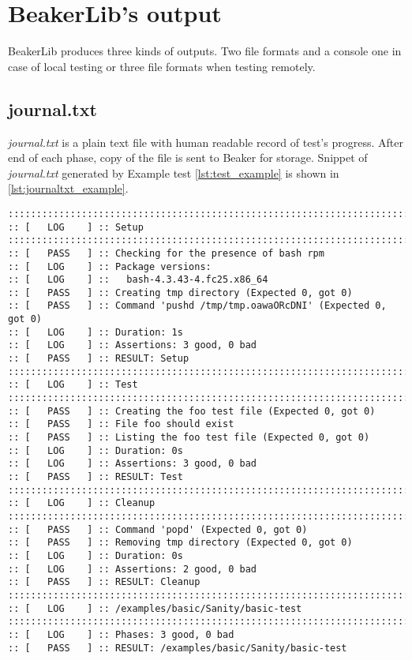 \section{BeakerLib's output}
BeakerLib produces three kinds of outputs. Two file formats and a console one in case of local testing or three file formats when testing remotely.

\subsection{journal.txt}
\textit{journal.txt} is a plain text file with human readable record of test's progress. After end of each phase, copy of the file is sent to Beaker for storage. Snippet of \textit{journal.txt} generated by Example test \ref{lst:test_example} is shown in \ref{lst:journaltxt_example}.


\begin{lstlisting}[style=txt,caption={Example of journal.txt},label={lst:journaltxt_example}]
::::::::::::::::::::::::::::::::::::::::::::::::::::::::::::::::::::::::::::::::
:: [   LOG    ] :: Setup
::::::::::::::::::::::::::::::::::::::::::::::::::::::::::::::::::::::::::::::::
:: [   PASS   ] :: Checking for the presence of bash rpm
:: [   LOG    ] :: Package versions:
:: [   LOG    ] ::   bash-4.3.43-4.fc25.x86_64
:: [   PASS   ] :: Creating tmp directory (Expected 0, got 0)
:: [   PASS   ] :: Command 'pushd /tmp/tmp.oawaORcDNI' (Expected 0, got 0)
:: [   LOG    ] :: Duration: 1s
:: [   LOG    ] :: Assertions: 3 good, 0 bad
:: [   PASS   ] :: RESULT: Setup
::::::::::::::::::::::::::::::::::::::::::::::::::::::::::::::::::::::::::::::::
:: [   LOG    ] :: Test
::::::::::::::::::::::::::::::::::::::::::::::::::::::::::::::::::::::::::::::::
:: [   PASS   ] :: Creating the foo test file (Expected 0, got 0)
:: [   PASS   ] :: File foo should exist
:: [   PASS   ] :: Listing the foo test file (Expected 0, got 0)
:: [   LOG    ] :: Duration: 0s
:: [   LOG    ] :: Assertions: 3 good, 0 bad
:: [   PASS   ] :: RESULT: Test
::::::::::::::::::::::::::::::::::::::::::::::::::::::::::::::::::::::::::::::::
:: [   LOG    ] :: Cleanup
::::::::::::::::::::::::::::::::::::::::::::::::::::::::::::::::::::::::::::::::
:: [   PASS   ] :: Command 'popd' (Expected 0, got 0)
:: [   PASS   ] :: Removing tmp directory (Expected 0, got 0)
:: [   LOG    ] :: Duration: 0s
:: [   LOG    ] :: Assertions: 2 good, 0 bad
:: [   PASS   ] :: RESULT: Cleanup
::::::::::::::::::::::::::::::::::::::::::::::::::::::::::::::::::::::::::::::::
:: [   LOG    ] :: /examples/basic/Sanity/basic-test
::::::::::::::::::::::::::::::::::::::::::::::::::::::::::::::::::::::::::::::::
:: [   LOG    ] :: Phases: 3 good, 0 bad
:: [   PASS   ] :: RESULT: /examples/basic/Sanity/basic-test
\end{lstlisting}

